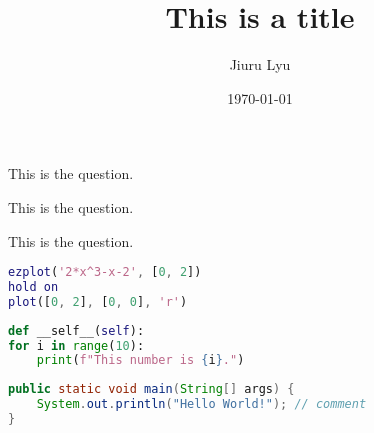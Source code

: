 

 
 \cfoot{}
  \renewcommand{\footrulewidth}{0.5pt}
\parindent 0in

\title{\textbf{This is a title}}
\author{Jiuru Lyu}
\date{\today}


\maketitle\thispagestyle{fancy}

\begin{question}
	This is the question.	
\end{question}
\begin{prf}
	
\end{prf}

\begin{question}
	This is the question.	
\end{question}
\begin{dis}
	
\end{dis}

\begin{question}
	This is the question.	
\end{question}
\begin{ans}
	
\end{ans}

\begin{lstlisting}[language = Matlab, title = {Answer.m}]
% Plot function f(x) = 2*x^3 - x - 2
ezplot('2*x^3-x-2', [0, 2])
hold on
plot([0, 2], [0, 0], 'r')
\end{lstlisting}

\begin{lstlisting}[language = Python]
def __self__(self):
for i in range(10):
	print(f"This number is {i}.")
\end{lstlisting}

\begin{lstlisting}[language = java]
public static void main(String[] args) {
	System.out.println("Hello World!"); // comment
}
\end{lstlisting}


